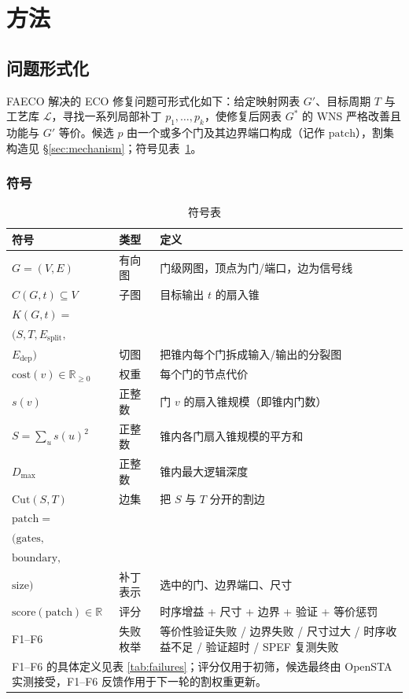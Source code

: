\documentclass[journal]{IEEEtran}
\begin{document}
\section{方法}

\subsection{问题形式化}
FAECO 解决的 ECO 修复问题可形式化如下：给定映射网表 $G'$、目标周期 $T$ 与工艺库 $\mathcal{L}$，寻找一系列局部补丁 $p_1,\dots,p_k$，使修复后网表 $G^*$ 的 WNS 严格改善且功能与 $G'$ 等价。候选 $p$ 由一个或多个门及其边界端口构成（记作 $\mathrm{patch}$），割集构造见 \S\ref{sec:mechanism}；符号见表~\ref{tab:symbols}。

\subsubsection{符号}
\begin{table}[!t]
\centering
\caption{符号表}
\label{tab:symbols}
\scriptsize
\setlength{\tabcolsep}{2pt}
\begin{tabular}{p{3.4cm}p{1.5cm}p{3.4cm}}
\toprule
\textbf{符号} & \textbf{类型} & \textbf{定义} \\
\midrule
$G = (V, E)$ & 有向图 & 门级网图，顶点为门/端口，边为信号线 \\
$C(G, t) \subseteq V$ & 子图 & 目标输出 $t$ 的扇入锥 \\
$K(G, t) =$ \\
$(S, T, E_{\mathrm{split}},$ \\
$E_{\mathrm{dep}})$ & 切图 & 把锥内每个门拆成输入/输出的分裂图 \\
$\mathrm{cost}(v) \in \mathbb{R}_{\geq 0}$ & 权重 & 每个门的节点代价 \\
$s(v)$ & 正整数 & 门 $v$ 的扇入锥规模（即锥内门数）\\
$S = \sum_u s(u)^2$ & 正整数 & 锥内各门扇入锥规模的平方和 \\

$D_{\max}$ & 正整数 & 锥内最大逻辑深度 \\
$\mathrm{Cut}(S, T)$ & 边集 & 把 $S$ 与 $T$ 分开的割边 \\
$\mathrm{patch} =$ \\
$(\mathrm{gates},$ \\
$\mathrm{boundary},$ \\
$\mathrm{size})$ & 补丁表示 & 选中的门、边界端口、尺寸 \\
$\mathrm{score}(\mathrm{patch}) \in \mathbb{R}$ & 评分 & 时序增益 + 尺寸 + 边界 + 验证 + 等价惩罚 \\
F1--F6 & 失败枚举 & 等价性验证失败 / 边界失败 / 尺寸过大 / 时序收益不足 / 验证超时 / SPEF 复测失败 \\
\bottomrule
\multicolumn{3}{p{8.0cm}}{\footnotesize F1--F6 的具体定义见表 \ref{tab:failures}；评分仅用于初筛，候选最终由 OpenSTA 实测接受，F1--F6 反馈作用于下一轮的割权重更新。}\\
\end{tabular}
\end{table}
\end{document}
